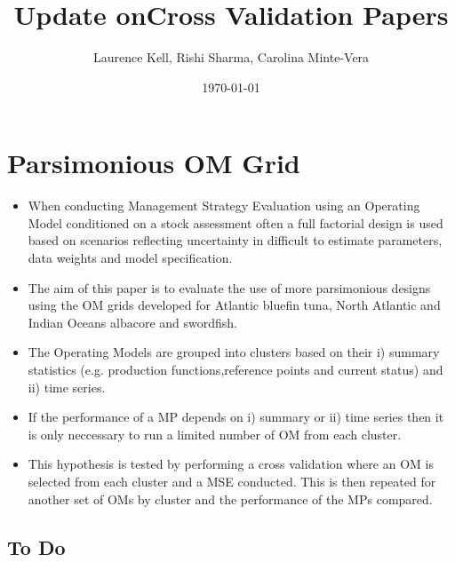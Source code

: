 \documentclass[a4paper,10pt]{article}
\title{Update onCross Validation Papers}
\author{Laurence Kell, Rishi Sharma, Carolina Minte-Vera}
\date{\today	}
\begin{document}
\maketitle


\section*{Parsimonious OM Grid}

\begin{itemize}
 \item When conducting Management Strategy Evaluation using an Operating Model conditioned on a stock assessment often a full factorial design is used based on scenarios reflecting uncertainty in difficult to estimate parameters, data weights and model specification. 
 \item The aim of this paper is to evaluate the use of more parsimonious designs using the OM grids developed for Atlantic bluefin tuna, North Atlantic and Indian Oceans albacore and swordfish. 
 \item The Operating Models are grouped into clusters based on their i) summary statistics (e.g. production functions,reference points and current status) and ii) time series. 
 \item If the performance of a MP depends on i) summary or ii) time series then it is only neccessary to run a limited number of OM from each cluster. 
 \item This hypothesis is tested by performing a cross validation where an OM is selected from each cluster and a MSE conducted. This is then repeated for another set of OMs by cluster and the performance of the MPs compared.    
\end{itemize}

\newpage	
\subsection*{To Do}
\end{document}
